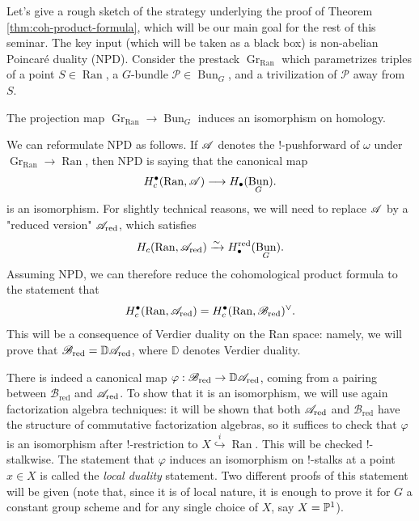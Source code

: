 \documentclass[oneside]{amsart}
\newcommand{\Bred}{\mathcal{B}_\text{red}}
\DeclareMathOperator{\Bun}{Bun}
\DeclareMathOperator{\Ran}{Ran}
\newcommand{\red}{_{\mathrm{red}}}
\DeclareMathOperator{\Gr}{Gr}
\def\D{\mathbb{D}}
\begin{document}
Let's give a rough sketch of the strategy underlying the proof of Theorem \ref{thm:coh-product-formula}, which will be our main goal for the rest of this seminar. The key input (which will be taken as a black box) is non-abelian Poincar\'e duality (NPD). Consider the prestack $\Gr_{\Ran}$ which parametrizes triples of a point $S\in \Ran$, a $G$-bundle $\mathcal{P}\in \Bun_G$, and a trivilization of $\mathcal{P}$ away from $S$.
\begin{theorem}
	The projection map $\Gr_{\Ran}\to \Bun_G$ induces an isomorphism on homology.
\end{theorem}
We can reformulate NPD as follows. If $\CA$ denotes the $!$-pushforward of $\omega$ under $\Gr_{\Ran}\to \Ran$, then NPD is saying that the canonical map
\[
H_c^\bullet(\Ran,\CA) \to H_\bullet(\Bun_G).
\] 
is an isomorphism.
For slightly technical reasons, we will need to replace $\CA$ by a "reduced version" $\CA\red$, which satisfies
\[
H_c(\Ran,\CA\red) \simto H_\bullet ^{\text{red}}(\Bun_G).
\] 
Assuming NPD, we can therefore reduce the cohomological product formula to the statement that 
\[
	H_c^\bullet(\Ran,\CA\red) = H_c^\bullet(\Ran,\Bred)^{\vee}.
\] 
This will be a consequence of Verdier duality on the Ran space: namely, we will prove that $\Bred=\D\CA\red$, where $\D$ denotes Verdier duality.

There is indeed a canonical map $\varphi: \Bred\to \D\CA\red$, coming from a pairing between $\Bred$ and $\CA\red$. To show that it is an isomorphism, we will use again factorization algebra techniques: it will be shown that both $\CA\red$ and $\Bred$ have the structure of commutative factorization algebras, so it suffices to check that $\varphi$ is an isomorphism after $!$-restriction to  $X \overset{i}{\hookrightarrow} \Ran$. This will be checked $!$-stalkwise. The statement that $\varphi$ induces an isomorphism on $!$-stalks at a point $x\in X$ is called the \emph{local duality} statement. Two different proofs of this statement will be given (note that, since it is of local nature, it is enough to prove it for $G$ a constant group scheme and for any single choice of $X$, say $X=\P^1$).
\end{document}
